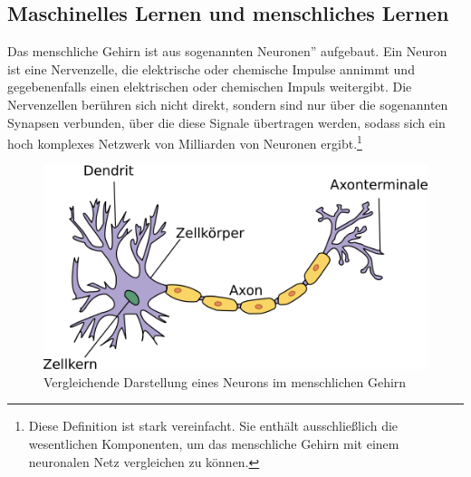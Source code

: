 \documentclass[11pt]{article}
\begin{document}
\subsection{Maschinelles Lernen und menschliches Lernen}
Das menschliche Gehirn ist aus sogenannten \glqq Neuronen'' aufgebaut. Ein Neuron ist eine Nervenzelle, die elektrische oder chemische Impulse annimmt und gegebenenfalls einen elektrischen oder chemischen Impuls weitergibt. Die Nervenzellen berühren sich nicht direkt, sondern sind nur über die sogenannten Synapsen verbunden, über die diese Signale übertragen werden, sodass sich ein hoch komplexes Netzwerk von Milliarden von Neuronen ergibt.\footnote{
Diese Definition ist stark vereinfacht. Sie enthält ausschließlich die wesentlichen Komponenten, um das menschliche Gehirn mit einem neuronalen Netz vergleichen zu können.}
\begin{figure}[h]
	\centering
	\includegraphics[]{../graphics/Neuron.png}
	\caption[Neuron \newline 
	Quelle: simple.wikipedia.org/wiki/File:Neuron.svg\newline
	Copyright: CC Attribution-Share Alike von Nutzer Dhp1080,\newline
 	bearbeitet]{Vergleichende Darstellung eines Neurons im menschlichen Gehirn}
\end{figure}
\end{document}
